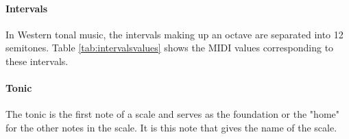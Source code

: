 \paragraph{Intervals}
In Western tonal music, the intervals making up an octave are separated into 12 semitones. Table \ref{tab:intervalsvalues} shows the MIDI values corresponding to these intervals.
\begin{table}[!h]
    \centering
    \caption{MIDI values of the intervals over an octave range.}
    \label{tab:intervalsvalues}
\end{table}

\paragraph{Tonic}
The tonic is the first note of a scale and serves as the foundation or the "home" for the other notes in the scale. It is this note that gives the name of the scale.

